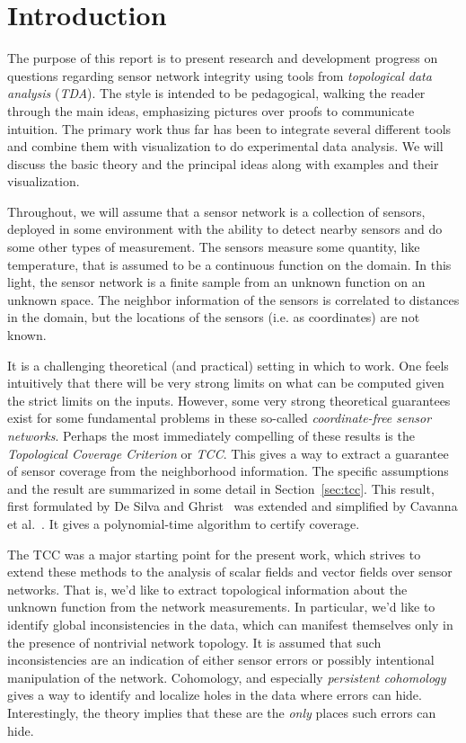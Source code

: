\section{Introduction} %
\label{sec:introduction}

  The purpose of this report is to present research and development progress on questions regarding sensor network integrity using tools from \emph{topological data analysis} (\emph{TDA}).
  The style is intended to be pedagogical, walking the reader through the main ideas, emphasizing pictures over proofs to communicate intuition.
  The primary work thus far has been to integrate several different tools and combine them with visualization to do experimental data analysis.
  We will discuss the basic theory and the principal ideas along with examples and their visualization.

  Throughout, we will assume that a sensor network is a collection of sensors, deployed in some environment with the ability to detect nearby sensors and do some other types of measurement.
  The sensors measure some quantity, like temperature, that is assumed to be a continuous function on the domain.
  In this light, the sensor network is a finite sample from an unknown function on an unknown space.
  The neighbor information of the sensors is correlated to distances in the domain, but the locations of the sensors (i.e. as coordinates) are not known.

  It is a challenging theoretical (and practical) setting in which to work.
  One feels intuitively that there will be very strong limits on what can be computed given the strict limits on the inputs.
  However, some very strong theoretical guarantees exist for some fundamental problems in these so-called \emph{coordinate-free sensor networks}.
  Perhaps the most immediately compelling of these results is the \emph{Topological Coverage Criterion} or \emph{TCC}.
  This gives a way to extract a guarantee of sensor coverage from the neighborhood information.
  The specific assumptions and the result are summarized in some detail in Section~\ref{sec:tcc}.
  This result, first formulated by De Silva and Ghrist~\cite{desilva07coverage} was extended and simplified by Cavanna et al.~\cite{cavanna17when}.
  It gives a polynomial-time algorithm to certify coverage.

  The TCC was a major starting point for the present work, which strives to extend these methods to the analysis of scalar fields and vector fields over sensor networks.
  That is, we'd like to extract topological information about the unknown function from the network measurements.
  In particular, we'd like to identify global inconsistencies in the data, which can manifest themselves only in the presence of nontrivial network topology.
  It is assumed that such inconsistencies are an indication of either sensor errors or possibly intentional manipulation of the network.
  Cohomology, and especially \emph{persistent cohomology} gives a way to identify and localize holes in the data where errors can hide.
  Interestingly, the theory implies that these are the \emph{only} places such errors can hide.

